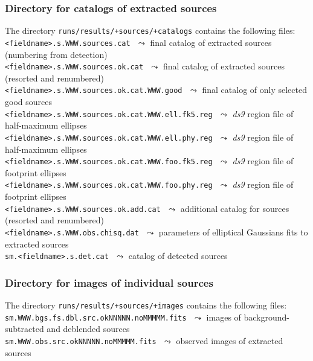\documentclass[a4paper,10pt]{article}
\begin{document}
\subsubsection{Directory for catalogs of extracted sources}
\label{srccats}

The directory \verb!runs/results/+sources/+catalogs! contains the following files:\\

\vspace{-2mm}\noindent
{\small\verb!<fieldname>.s.WWW.sources.cat!} $\,\,\leadsto$ final catalog of extracted sources (numbering from detection)\\
{\small\verb!<fieldname>.s.WWW.sources.ok.cat!} $\,\,\leadsto$ final catalog of extracted sources (resorted and renumbered)\\
{\small\verb!<fieldname>.s.WWW.sources.ok.cat.WWW.good!} $\,\,\leadsto$ final catalog of only selected good sources\\
{\small\verb!<fieldname>.s.WWW.sources.ok.cat.WWW.ell.fk5.reg!} $\,\,\leadsto$ \textsl{ds9} region file of half-maximum ellipses\\
{\small\verb!<fieldname>.s.WWW.sources.ok.cat.WWW.ell.phy.reg!} $\,\,\leadsto$ \textsl{ds9} region file of half-maximum ellipses\\
{\small\verb!<fieldname>.s.WWW.sources.ok.cat.WWW.foo.fk5.reg!} $\,\,\leadsto$ \textsl{ds9} region file of footprint ellipses\\
{\small\verb!<fieldname>.s.WWW.sources.ok.cat.WWW.foo.phy.reg!} $\,\,\leadsto$ \textsl{ds9} region file of footprint ellipses\\
{\small\verb!<fieldname>.s.WWW.sources.ok.add.cat!} $\,\,\leadsto$ additional catalog for sources (resorted and renumbered)\\
{\small\verb!<fieldname>.s.WWW.obs.chisq.dat!} $\,\,\leadsto$ parameters of elliptical Gaussians fits to extracted sources\\
{\small\verb!sm.<fieldname>.s.det.cat!} $\,\,\leadsto$ catalog of detected sources

\subsubsection{Directory for images of individual sources}
\label{srccats}

The directory \verb!runs/results/+sources/+images! contains the following files:\\

\vspace{-2mm}\noindent
{\small\verb!sm.WWW.bgs.fs.dbl.src.okNNNNN.noMMMMM.fits!} $\,\,\leadsto$ images of background-subtracted and deblended sources\\
{\small\verb!sm.WWW.obs.src.okNNNNN.noMMMMM.fits!} $\,\,\leadsto$ observed images of extracted sources
\end{document}
